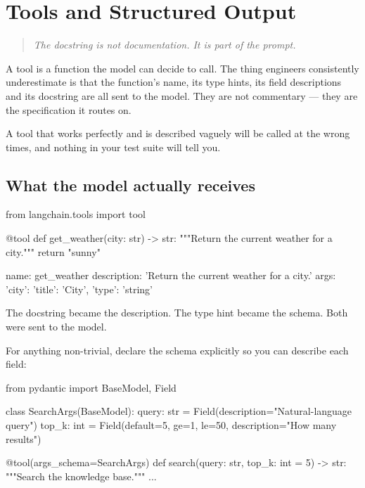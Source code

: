\chapter{Tools and Structured Output}
\label{ch:tools}

\begin{quote}\itshape
The docstring is not documentation. It is part of the prompt.
\end{quote}

\noindent
A tool is a function the model can decide to call. The thing engineers
consistently underestimate is that the function's name, its type hints, its field
descriptions and its docstring are all sent to the model. They are not
commentary --- they are the specification it routes on.

A tool that works perfectly and is described vaguely will be called at the wrong
times, and nothing in your test suite will tell you.

\section{What the model actually receives}
\label{sec:tool-schema}

\begin{python}[caption={A tool, and the schema it generates}, label={lst:tool}]
from langchain.tools import tool


@tool
def get_weather(city: str) -> str:
    """Return the current weather for a city."""
    return "sunny"
\end{python}

\begin{console}
name:        get_weather
description: 'Return the current weather for a city.'
args:        {'city': {'title': 'City', 'type': 'string'}}
\end{console}

The docstring became the description. The type hint became the schema. Both were
sent to the model.


For anything non-trivial, declare the schema explicitly so you can describe each
field:

\begin{python}[caption={An explicit schema with descriptions}, label={lst:args-schema}]
from pydantic import BaseModel, Field


class SearchArgs(BaseModel):
    query: str = Field(description="Natural-language query")
    top_k: int = Field(default=5, ge=1, le=50, description="How many results")


@tool(args_schema=SearchArgs)
def search(query: str, top_k: int = 5) -> str:
    """Search the knowledge base."""
    ...
\end{python}

